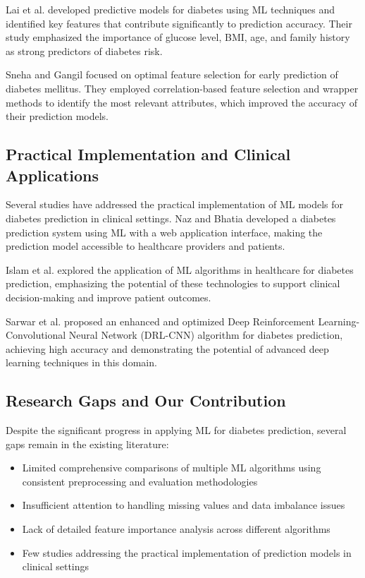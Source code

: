 \documentclass[conference]{IEEEtran}
\begin{document}
Lai et al. \cite{lai2019} developed predictive models for diabetes using ML techniques and identified key features that contribute significantly to prediction accuracy. Their study emphasized the importance of glucose level, BMI, age, and family history as strong predictors of diabetes risk.

Sneha and Gangil \cite{sneha2019} focused on optimal feature selection for early prediction of diabetes mellitus. They employed correlation-based feature selection and wrapper methods to identify the most relevant attributes, which improved the accuracy of their prediction models.

\subsection{Practical Implementation and Clinical Applications}
Several studies have addressed the practical implementation of ML models for diabetes prediction in clinical settings. Naz and Bhatia \cite{naz2023} developed a diabetes prediction system using ML with a web application interface, making the prediction model accessible to healthcare providers and patients.

Islam et al. \cite{islam2018} explored the application of ML algorithms in healthcare for diabetes prediction, emphasizing the potential of these technologies to support clinical decision-making and improve patient outcomes.

Sarwar et al. \cite{sarwar2024} proposed an enhanced and optimized Deep Reinforcement Learning-Convolutional Neural Network (DRL-CNN) algorithm for diabetes prediction, achieving high accuracy and demonstrating the potential of advanced deep learning techniques in this domain.

\subsection{Research Gaps and Our Contribution}
Despite the significant progress in applying ML for diabetes prediction, several gaps remain in the existing literature:

\begin{itemize}
    \item Limited comprehensive comparisons of multiple ML algorithms using consistent preprocessing and evaluation methodologies
    \item Insufficient attention to handling missing values and data imbalance issues
    \item Lack of detailed feature importance analysis across different algorithms
    \item Few studies addressing the practical implementation of prediction models in clinical settings
\end{itemize}
\end{document}
